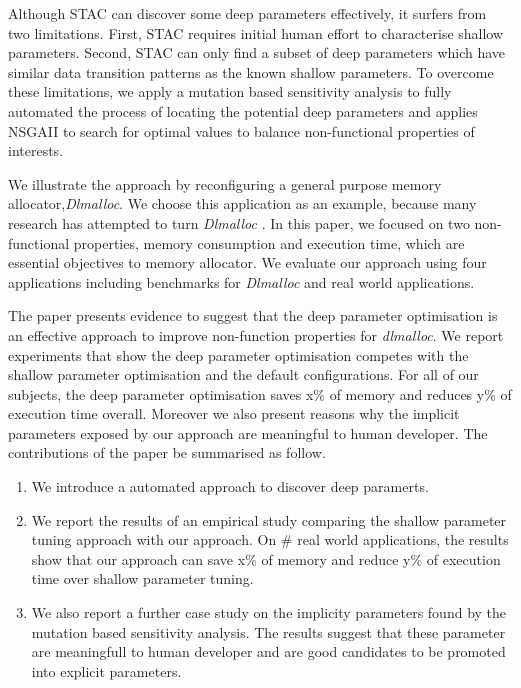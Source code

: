 Although STAC can discover some deep parameters effectively, it surfers from two limitations. First, STAC requires initial human effort to characterise shallow parameters. Second, STAC can only find a subset of deep parameters which have similar data transition patterns as the known shallow parameters. To overcome these limitations, we apply a mutation based sensitivity analysis to fully automated the process of locating the potential deep parameters and applies NSGAII to search for  optimal values to balance non-functional properties of interests. 

We illustrate the approach by reconfiguring a general purpose memory allocator,\emph{Dlmalloc}. We choose this application as an example, because many research has attempted to turn \emph{Dlmalloc} \cite{Risco-Martin:2009:ODM:1569901.1570116,RiscoMartin2010572}. In this paper, we focused on two non-functional properties, memory consumption and execution time, which are essential objectives to memory allocator. We evaluate our approach using four applications including benchmarks for \emph{Dlmalloc} and real world applications.

The paper presents evidence to suggest that the deep parameter optimisation is an effective approach to improve non-function properties for \emph{dlmalloc}. 
We report experiments that show the deep parameter optimisation competes with the shallow parameter optimisation and the default configurations. For all of our subjects, the deep parameter optimisation saves x\% of memory and reduces y\% of execution time overall. Moreover we also present reasons why the implicit parameters exposed by our approach are meaningful to human developer. The contributions of the paper be summarised as follow.


\begin{enumerate}

\item We introduce a automated approach to discover deep paramerts. 

\item We report the results of an empirical study comparing the shallow parameter tuning approach with our approach. On \# real world applications, the results show that our approach can save x\% of memory and reduce y\% of execution time over shallow parameter tuning. 

\item We also report a further case study on the implicity parameters found by the mutation based sensitivity analysis. The results suggest that these parameter are meaningfull to human developer and are good candidates to be promoted into explicit parameters. 

\end{enumerate}



